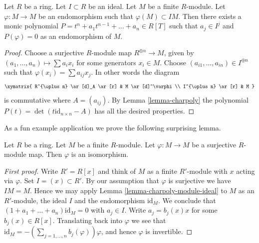 \begin{lemma}
\label{lemma-charpoly-module-ideal}
Let $R$ be a ring. Let $I \subset R$ be an ideal.
Let $M$ be a finite $R$-module.
Let $\varphi : M \to M$ be an endomorphism such
that $\varphi(M) \subset IM$.
Then there exists a monic polynomial
$P = t^n + a_1 t^{n - 1} + \ldots + a_n \in R[T]$
such that $a_j \in I^j$ and $P(\varphi) = 0$ as an endomorphism of $M$.
\end{lemma}

\begin{proof}
Choose a surjective $R$-module map $R^{\oplus n} \to M$, given by
$(a_1, \ldots, a_n) \mapsto \sum a_ix_i$ for some generators $x_i \in M$.
Choose $(a_{i1}, \ldots, a_{in}) \in I^{\oplus n}$ such that
$\varphi(x_i) = \sum a_{ij} x_j$. In other words the diagram
$$
\xymatrix{
R^{\oplus n} \ar[d]_A \ar[r] & M \ar[d]^\varphi \\
I^{\oplus n} \ar[r] & M
}
$$
is commutative where $A = (a_{ij})$. By
Lemma \ref{lemma-charpoly}
the polynomial
$P(t) = \det(t\text{id}_{n \times n} - A)$
has all the desired properties.
\end{proof}

\noindent
As a fun example application we prove the following surprising lemma.

\begin{lemma}
\label{lemma-fun}
Let $R$ be a ring.
Let $M$ be a finite $R$-module.
Let $\varphi : M \to M$ be a surjective $R$-module map.
Then $\varphi$ is an isomorphism.
\end{lemma}

\begin{proof}[First proof]
Write $R' = R[x]$ and think of $M$ as a finite $R'$-module with
$x$ acting via $\varphi$. Set $I = (x) \subset R'$. By our assumption that
$\varphi$ is surjective we have $IM = M$. Hence we may apply
Lemma \ref{lemma-charpoly-module-ideal}
to $M$ as an $R'$-module, the ideal $I$ and the endomorphism $\text{id}_M$.
We conclude that
$(1 + a_1 + \ldots + a_n)\text{id}_M = 0$ with $a_j \in I$.
Write $a_j = b_j(x)x$ for some $b_j(x) \in R[x]$.
Translating back into $\varphi$ we see that
$\text{id}_M = -(\sum_{j = 1, \ldots, n} b_j(\varphi)) \varphi$, and hence
$\varphi$ is invertible.
\end{proof}

